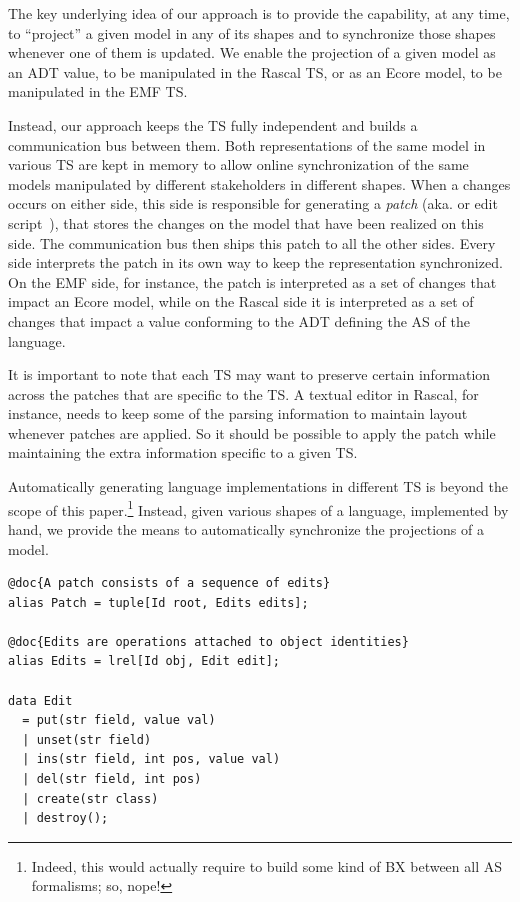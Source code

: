 The key underlying idea of our approach is to provide the capability, at any time, to ``project'' a given model in any of its shapes and to synchronize those shapes whenever one of them is updated.
We enable the projection of a given model as an ADT value, to be manipulated in the Rascal TS, or as an Ecore model, to be manipulated in the EMF TS.

Instead, our approach keeps the TS fully independent and builds a communication bus between them.
Both representations of the same model in various TS are kept in memory to allow online synchronization of the same models manipulated by different stakeholders in different shapes.
When a changes occurs on either side, this side is responsible for generating a \emph{patch} (aka. \de or edit script~\cite{rozen2017towards}), that stores the changes on the model that have been realized on this side.
The communication bus then ships this patch to all the other sides.
Every side interprets the patch in its own way to keep the representation synchronized.
On the EMF side, for instance, the patch is interpreted as a set of changes that impact an Ecore model, while on the Rascal side it is interpreted as a set of changes that impact a value conforming to the ADT defining the AS of the language.

It is important to note that each TS may want to preserve certain information across the patches that are specific to the TS.
A textual editor in Rascal, for instance, needs to keep some of the parsing information to maintain layout whenever patches are applied.
So it should be possible to apply the patch while maintaining the extra information specific to a given TS.

Automatically generating language implementations in different TS is beyond the scope of this paper.\footnote{Indeed, this would actually require to build some kind of BX between all AS formalisms; so, nope!} Instead, given various shapes of a language, implemented by hand, we provide the means to automatically synchronize the projections of a model.

\begin{lstlisting}[label=lst:delta-adt, caption={CRUD-like \ds structure definition in Rascal}, language=Rascal]
@doc{A patch consists of a sequence of edits}
alias Patch = tuple[Id root, Edits edits];

@doc{Edits are operations attached to object identities}
alias Edits = lrel[Id obj, Edit edit];

data Edit
  = put(str field, value val)
  | unset(str field)
  | ins(str field, int pos, value val)
  | del(str field, int pos)
  | create(str class) 
  | destroy();
\end{lstlisting}

